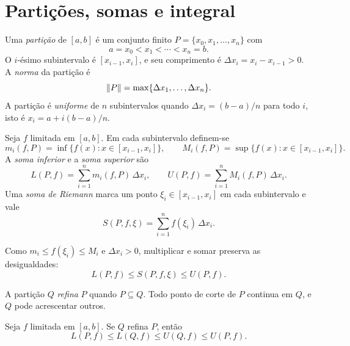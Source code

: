 \documentclass[11pt,a4paper]{article}
\begin{document}
\section{Partições, somas e integral}

\begin{definicao}
Uma \emph{partição} de $[a,b]$ é um conjunto finito $P=\{x_0,x_1,\ldots,x_n\}$ com
\[
a=x_0<x_1<\cdots<x_n=b.
\]
O $i$-ésimo subintervalo é $[x_{i-1},x_i]$, e seu comprimento é $\Delta x_i=x_i-x_{i-1}>0$. A \emph{norma} da partição é
\[
\left\lVert P \right\rVert=\max\{\Delta x_1,\ldots,\Delta x_n\}.
\]
A partição é \emph{uniforme} de $n$ subintervalos quando $\Delta x_i=(b-a)/n$ para todo $i$, isto é $x_i=a+i(b-a)/n$.

Seja $f$ limitada em $[a,b]$. Em cada subintervalo definem-se
\[
m_i(f,P)=\inf\{f(x):x\in[x_{i-1},x_i]\},\qquad
M_i(f,P)=\sup\{f(x):x\in[x_{i-1},x_i]\}.
\]
A \emph{soma inferior} e a \emph{soma superior} são
\[
L(P,f)=\sum_{i=1}^n m_i(f,P)\,\Delta x_i,\qquad
U(P,f)=\sum_{i=1}^n M_i(f,P)\,\Delta x_i.
\]
Uma \emph{soma de Riemann} marca um ponto $\xi_i\in[x_{i-1},x_i]$ em cada subintervalo e vale
\[
S(P,f,\xi)=\sum_{i=1}^n f(\xi_i)\,\Delta x_i.
\]
\end{definicao}

Como $m_i\le f(\xi_i)\le M_i$ e $\Delta x_i>0$, multiplicar e somar preserva as desigualdades:
\begin{equation}
\label{eq:entre}
L(P,f)\le S(P,f,\xi)\le U(P,f).
\end{equation}


\begin{definicao}
A partição $Q$ \emph{refina} $P$ quando $P\subseteq Q$. Todo ponto de corte de $P$ continua em $Q$, e $Q$ pode acrescentar outros.
\end{definicao}

\begin{lema}[Refinamento]\label{lem:refino}
Seja $f$ limitada em $[a,b]$. Se $Q$ refina $P$, então
\[
L(P,f)\le L(Q,f)\le U(Q,f)\le U(P,f).
\]
\end{lema}
\end{document}

